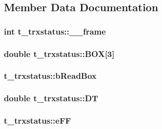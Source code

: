 \subsection{\-Member \-Data \-Documentation}
\hypertarget{structt__trxstatus_ae4bd66cd09c4b71ff54653fc305dc745}{
\subsubsection[{\-\_\-\-\_\-frame}]{\setlength{\rightskip}{0pt plus 5cm}int {\bf t\-\_\-trxstatus\-::\-\_\-\-\_\-frame}}}\label{structt__trxstatus_ae4bd66cd09c4b71ff54653fc305dc745}
\hypertarget{structt__trxstatus_aca3cc62fa45499ab0a7474cb183ed6a1}{
\subsubsection[{\-B\-O\-X}]{\setlength{\rightskip}{0pt plus 5cm}double {\bf t\-\_\-trxstatus\-::\-B\-O\-X}\mbox{[}3\mbox{]}}}\label{structt__trxstatus_aca3cc62fa45499ab0a7474cb183ed6a1}
\hypertarget{structt__trxstatus_a09c6fd6b908a4041937d85ceaf429410}{
\subsubsection[{b\-Read\-Box}]{ {\bf t\-\_\-trxstatus\-::b\-Read\-Box}}}\label{structt__trxstatus_a09c6fd6b908a4041937d85ceaf429410}
\hypertarget{structt__trxstatus_a7bef365f68bd0314b0018b27b588c040}{
\subsubsection[{\-D\-T}]{\setlength{\rightskip}{0pt plus 5cm}double {\bf t\-\_\-trxstatus\-::\-D\-T}}}\label{structt__trxstatus_a7bef365f68bd0314b0018b27b588c040}
\hypertarget{structt__trxstatus_a2a29b836b272e0aa597616cee24877a6}{
\subsubsection[{e\-F\-F}]{ {\bf t\-\_\-trxstatus\-::e\-F\-F}}}\label{structt__trxstatus_a2a29b836b272e0aa597616cee24877a6}
